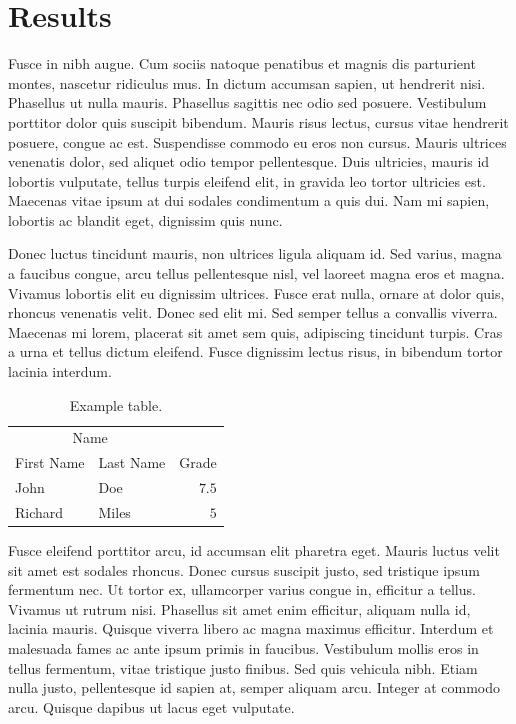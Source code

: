 \documentclass[12pt]{diazessay} %
\begin{document}

\section*{Results}

Fusce in nibh augue. Cum sociis natoque penatibus et magnis dis parturient montes, nascetur ridiculus mus. In dictum accumsan sapien, ut hendrerit nisi. Phasellus ut nulla mauris. Phasellus sagittis nec odio sed posuere. Vestibulum porttitor dolor quis suscipit bibendum. Mauris risus lectus, cursus vitae hendrerit posuere, congue ac est. Suspendisse commodo eu eros non cursus. Mauris ultrices venenatis dolor, sed aliquet odio tempor pellentesque. Duis ultricies, mauris id lobortis vulputate, tellus turpis eleifend elit, in gravida leo tortor ultricies est. Maecenas vitae ipsum at dui sodales condimentum a quis dui. Nam mi sapien, lobortis ac blandit eget, dignissim quis nunc.

Donec luctus tincidunt mauris, non ultrices ligula aliquam id. Sed varius, magna a faucibus congue, arcu tellus pellentesque nisl, vel laoreet magna eros et magna. Vivamus lobortis elit eu dignissim ultrices. Fusce erat nulla, ornare at dolor quis, rhoncus venenatis velit. Donec sed elit mi. Sed semper tellus a convallis viverra. Maecenas mi lorem, placerat sit amet sem quis, adipiscing tincidunt turpis. Cras a urna et tellus dictum eleifend. Fusce dignissim lectus risus, in bibendum tortor lacinia interdum.

\begin{table}[h] %
	\caption{Example table.}
	\centering
	\begin{tabular}{l l r}
		\toprule
		\multicolumn{2}{c}{Name} \\
		\cmidrule(r){1-2}
		First Name & Last Name & Grade \\
		\midrule
		John & Doe & $7.5$ \\
		Richard & Miles & $5$ \\
		\bottomrule
	\end{tabular}
\end{table}

Fusce eleifend porttitor arcu, id accumsan elit pharetra eget. Mauris luctus velit sit amet est sodales rhoncus. Donec cursus suscipit justo, sed tristique ipsum fermentum nec. Ut tortor ex, ullamcorper varius congue in, efficitur a tellus. Vivamus ut rutrum nisi. Phasellus sit amet enim efficitur, aliquam nulla id, lacinia mauris. Quisque viverra libero ac magna maximus efficitur. Interdum et malesuada fames ac ante ipsum primis in faucibus. Vestibulum mollis eros in tellus fermentum, vitae tristique justo finibus. Sed quis vehicula nibh. Etiam nulla justo, pellentesque id sapien at, semper aliquam arcu. Integer at commodo arcu. Quisque dapibus ut lacus eget vulputate.
\end{document}
